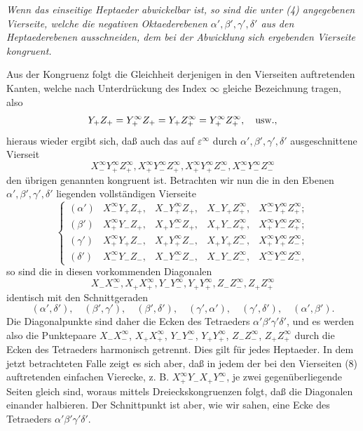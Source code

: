 \documentclass[11pt,a4paper]{article}
\begin{document}
\emph{Wenn das einseitige Heptaeder abwickelbar ist, so sind die unter (4) angegebenen Vierseite, welche die negativen Oktaederebenen $\alpha',\beta',\gamma',\delta'$ aus den Heptaederebenen ausschneiden, dem bei der Abwicklung sich ergebenden Vierseite kongruent.}

Aus der Kongruenz folgt die Gleichheit derjenigen in den Vierseiten auftretenden Kanten, welche nach Unterdr\"uckung des Index $\infty$ gleiche Bezeichnung tragen, also
\[
Y_+Z_+=Y_+^\infty Z_+=Y_+Z_+^\infty=Y_+^\infty Z_+^\infty,\quad\hbox{usw.},
\]
hieraus wieder ergibt sich, da\ss{} auch das auf $\varepsilon^\infty$ durch $\alpha',\beta',\gamma',\delta'$ ausgeschnittene Vierseit
\[
X_-^\infty Y_+^\infty Z_+^\infty,
X_+^\infty Y_-^\infty Z_+^\infty,
X_+^\infty Y_+^\infty Z_-^\infty,
X_-^\infty Y_-^\infty Z_-^\infty
\]
den \"ubrigen genannten kongruent ist. Betrachten wir nun die in den Ebenen $\alpha',\beta',\gamma',\delta'$ liegenden vollst\"andigen Vierseite
\[
\renewcommand{\arraystretch}{1.2}
\left\{
\begin{array}{lllll}
(\alpha')&X_-^\infty Y_+Z_+,&X_-Y_+^\infty Z_+,&X_-Y_+Z_+^\infty,&X_-^\infty Y_+^\infty Z_+^\infty;\\
(\beta')&X_+^\infty Y_-Z_+,&X_+Y_-^\infty Z_+,&X_+Y_-Z_+^\infty,&X_+^\infty Y_-^\infty Z_+^\infty;\\
(\gamma')&X_+^\infty Y_+Z_-,&X_+Y_+^\infty Z_-,&X_+Y_+Z_-^\infty,&X_+^\infty Y_+^\infty Z_-^\infty;\\
(\delta')&X_-^\infty Y_-Z_-,&X_-Y_-^\infty Z_-,&X_-Y_-Z_-^\infty,&X_-^\infty Y_-^\infty Z_-^\infty,
\end{array}\right.\tag{8}
\]
so sind die in diesen vorkommenden Diagonalen
\[
 X_-X_-^\infty,
 X_+X_+^\infty,
 Y_-Y_-^\infty,
 Y_+Y_+^\infty,
 Z_-Z_-^\infty,
 Z_+Z_+^\infty
\]
identisch mit den Schnittgeraden
\[
(\alpha',\delta'),\quad(\beta',\gamma'),\quad(\beta',\delta'),\quad(\gamma',\alpha'),\quad(\gamma',\delta'),\quad(\alpha',\beta').
\]
Die Diagonalpunkte sind daher die Ecken des Tetraeders $\alpha'\beta'\gamma'\delta'$, und es werden also die Punktepaare $X_-X_-^\infty$, $X_+X_+^\infty$, $Y_-Y_-^\infty$, $Y_+Y_+^\infty$, $Z_-Z_-^\infty$, $Z_+Z_+^\infty$ durch die Ecken des Tetraeders harmonisch getrennt. Dies gilt f\"ur jedes Heptaeder. In dem jetzt betrachteten Falle zeigt es sich aber, da\ss{} in jedem der bei den Vierseiten (8) auftretenden einfachen Vierecke, z. B. $X_+^\infty Y_-X_+Y_-^\infty$, je zwei gegen\"uberliegende Seiten gleich sind, woraus mittels Dreieckskongruenzen folgt, da\ss{} die Diagonalen einander halbieren. Der Schnittpunkt ist aber, wie wir sahen, eine Ecke des Tetraeders $\alpha'\beta'\gamma'\delta'$.
\end{document}
